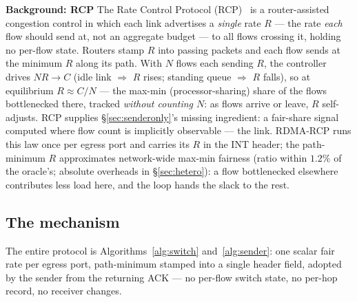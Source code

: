 \documentclass[conference]{IEEEtran}
\newcommand{\hpccfs}{\textsc{RDMA-RCP}\xspace}
\renewcommand{\paragraph}[1]{\par\smallskip\noindent\textbf{#1}\hspace{0.5em}\ignorespaces}
\begin{document}
\paragraph{Background: RCP} The Rate Control Protocol (RCP)~\cite{dukkipati2006fct,dukkipati2008rcp} is a
router-assisted congestion control in which each link advertises a \emph{single} rate $R$
--- the rate \emph{each} flow should send at, not an aggregate budget --- to all flows
crossing it, holding no per-flow state. Routers stamp $R$ into passing packets and each flow
sends at the minimum $R$ along its path. With $N$ flows each
sending $R$, the controller drives $N R \to C$ (idle link $\Rightarrow$ $R$ rises; standing
queue $\Rightarrow$ $R$ falls), so at equilibrium $R \approx C/N$ --- the max-min
(processor-sharing) share of the flows bottlenecked there, tracked \emph{without counting $N$}:
as flows arrive or leave, $R$ self-adjusts. RCP supplies \S\ref{sec:senderonly}'s missing
ingredient: a fair-share signal computed where flow count is implicitly observable --- the
link. \hpccfs runs this law once per egress port and carries its $R$ in the INT header; the
path-minimum $R$ approximates network-wide max-min fairness (ratio within $1.2\%$ of the
oracle's; absolute overheads in \S\ref{sec:hetero}): a flow bottlenecked elsewhere
contributes less load here, and the loop hands the slack to the rest.

\subsection{The mechanism}

The entire protocol is Algorithms~\ref{alg:switch} and~\ref{alg:sender}: one scalar fair
rate per egress port, path-minimum stamped into a single header field, adopted by the sender
from the returning ACK --- no per-flow switch state, no per-hop record, no receiver
changes.
\end{document}
